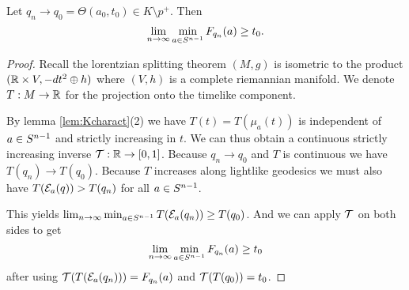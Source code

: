 \begin{lemma}\label{lem:unifconvawayfrommin}
    Let $q_n\to q_0=\Theta(a_0,t_0)\in K\setminus p^+$. Then 
    \[
        \lim_{n\to \infty} \min_{a \in {S^{n-1}}} F_{q_n}(a) \ge t_0.
    \]
\end{lemma}
\begin{proof}
    Recall the lorentzian splitting theorem $(M,g)$ is isometric to the product $(\mathbb{R}\times V,-dt^2 \oplus h)$ where $(V,h)$ is a complete riemannian manifold. We denote $T:M\to \mathbb{R}$ for the projection onto the timelike component.

    By lemma \ref{lem:Kcharact}(2) we have $T(t)=T(\mu_a(t))$ is independent of $a\in {S^{n-1}}$ and strictly increasing in $t$. We can thus obtain a continuous strictly increasing inverse ${\mathcal{T}}:\mathbb{R} \to [0,1]$. Because $q_n\to q_0$ and $T$ is continuous we have $T(q_n)\to T(q_0)$. Because $T$ increases along lightlike geodesics we must also have $T({\mathcal{E}}_a(q))>T(q_n)$ for all $a\in {S^{n-1}}$. 

    This yields $\lim_{n\to \infty} \min_{a\in {S^{n-1}}}T({\mathcal{E}}_a(q_n)) \ge T(q_0)$. And we can apply ${\mathcal{T}}$ on both sides to get
    \[
        \lim_{n\to \infty} \min_{a\in {S^{n-1}}}F_{q_n}(a) \ge t_0
    \] after using ${\mathcal{T}}(T({\mathcal{E}}_a(q_n))) = F_{q_n}(a)$ and ${\mathcal{T}}(T(q_0))=t_0$.
\end{proof}

\newpage

